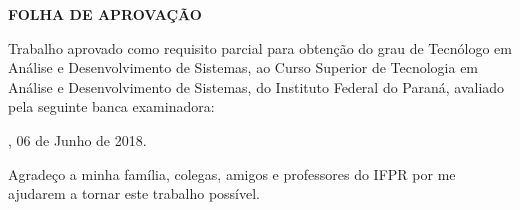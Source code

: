 \documentclass[
article,			%
12pt,				%
openright,			%
oneside,			%
a4paper,			%
chapter=TITLE,		%
section=TITLE,		%
subsection=TITLE,	%
subsubsection=TITLE,%
subsubsubsection=TITLE, %
english,			%
brazil,				%
]{abntex2}
\begin{document}
\begin{folhadeaprovacao}
    \begin{center}
        \begin{center}
            \ABNTEXchapterfont\bfseries FOLHA DE APROVAÇÃO
            \par
            \vspace*{1.5cm}
            {\normalfont\ABNTEXchapterfontsize\MakeUppercase\imprimirautor}
            \vspace*{1.5cm}
            \par
            {\normalfont\ABNTEXchapterfontsize\MakeUppercase\imprimirtitulo}
        \end{center}
        \vspace*{\fill}

        \hspace{.45\textwidth} 
        \begin{minipage}{.5\textwidth}

            Trabalho aprovado como requisito parcial para obtenção do
            grau de Tecnólogo em Análise e Desenvolvimento de
            Sistemas, ao Curso Superior de Tecnologia em Análise e
            Desenvolvimento de Sistemas, do Instituto Federal do
            Paraná, avaliado pela seguinte banca examinadora: 
        
        \end{minipage}%
        \vspace*{\fill} \end{center}


    \vspace{3cm}
    \begin{center}
        \imprimirlocal, 06 de Junho de 2018.
    \end{center}

    \pagebreak
\end{folhadeaprovacao}


\begin{agradecimentos} 
    
    Agradeço a minha família, colegas, amigos e professores do IFPR
    por me ajudarem a tornar este trabalho possível.

    \pagebreak
\end{agradecimentos}
\end{document}
